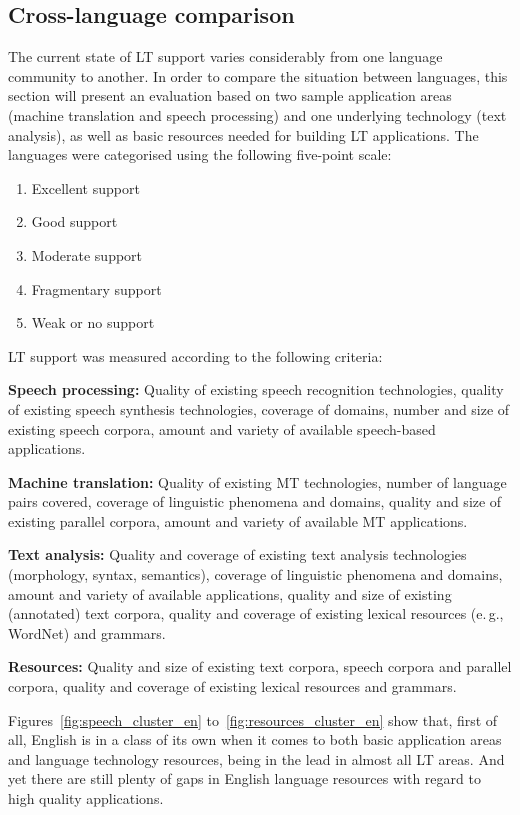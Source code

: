 \begin{multicols}{2}
\subsection{Cross-language comparison}

The current state of LT support varies considerably from one language community to another. In order to compare the situation between languages, this section will present an evaluation based on two sample application areas (machine translation and speech processing) and one underlying technology (text analysis), as well as basic resources needed for building LT applications. The languages were categorised using the following five-point scale: 

\begin{enumerate}
\item Excellent support
\item Good support
\item Moderate support
\item Fragmentary support
\item Weak or no support
\end{enumerate}

LT support was measured according to the following criteria:

\textbf{Speech processing:} Quality of existing speech recognition technologies, quality of existing speech synthesis technologies, coverage of domains, number and size of existing speech corpora, amount and variety of available speech-based applications.

\textbf{Machine translation:} Quality of existing MT technologies, number of language pairs covered, coverage of linguistic phenomena and domains, quality and size of existing parallel corpora, amount and variety of available MT applications.

\textbf{Text analysis:} Quality and coverage of existing text analysis technologies (morphology, syntax, semantics), coverage of linguistic phenomena and domains, amount and variety of available applications, quality and size of existing (annotated) text corpora, quality and coverage of existing lexical resources (e.\,g., WordNet) and grammars.

\textbf{Resources:} Quality and size of existing text corpora, speech corpora and parallel corpora, quality and coverage of existing lexical resources and grammars.

Figures~\ref{fig:speech_cluster_en} to~\ref{fig:resources_cluster_en}
show that, first of all, English is in a class of its own when it
comes to both basic application areas and language technology
resources, being in the lead in almost all LT areas. And yet there are
still plenty of gaps in English language resources with regard to high
quality applications.


\end{multicols}
